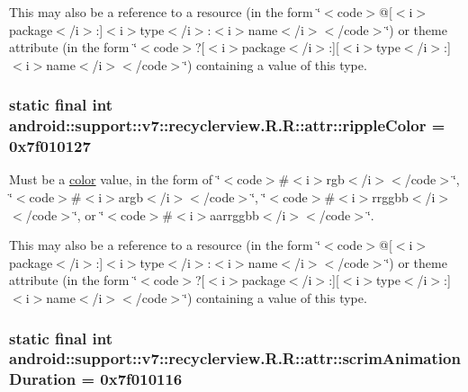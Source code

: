 This may also be a reference to a resource (in the form \char`\"{}$<$code$>$@\mbox{[}$<$i$>$package$<$/i$>$:\mbox{]}$<$i$>$type$<$/i$>$:$<$i$>$name$<$/i$>$$<$/code$>$\char`\"{}) or theme attribute (in the form \char`\"{}$<$code$>$?\mbox{[}$<$i$>$package$<$/i$>$:\mbox{]}\mbox{[}$<$i$>$type$<$/i$>$:\mbox{]}$<$i$>$name$<$/i$>$$<$/code$>$\char`\"{}) containing a value of this type. \hypertarget{classandroid_1_1support_1_1v7_1_1recyclerview_1_1_r_1_1attr_aa39993c99447facca3f15bc950aef26}{
\subsubsection[{rippleColor}]{\setlength{\rightskip}{0pt plus 5cm}static final int android::support::v7::recyclerview.R.R::attr::rippleColor = 0x7f010127}}
\label{classandroid_1_1support_1_1v7_1_1recyclerview_1_1_r_1_1attr_aa39993c99447facca3f15bc950aef26}


Must be a \hyperlink{classandroid_1_1support_1_1v7_1_1recyclerview_1_1_r_1_1color}{color} value, in the form of \char`\"{}$<$code$>$\#$<$i$>$rgb$<$/i$>$$<$/code$>$\char`\"{}, \char`\"{}$<$code$>$\#$<$i$>$argb$<$/i$>$$<$/code$>$\char`\"{}, \char`\"{}$<$code$>$\#$<$i$>$rrggbb$<$/i$>$$<$/code$>$\char`\"{}, or \char`\"{}$<$code$>$\#$<$i$>$aarrggbb$<$/i$>$$<$/code$>$\char`\"{}. 

This may also be a reference to a resource (in the form \char`\"{}$<$code$>$@\mbox{[}$<$i$>$package$<$/i$>$:\mbox{]}$<$i$>$type$<$/i$>$:$<$i$>$name$<$/i$>$$<$/code$>$\char`\"{}) or theme attribute (in the form \char`\"{}$<$code$>$?\mbox{[}$<$i$>$package$<$/i$>$:\mbox{]}\mbox{[}$<$i$>$type$<$/i$>$:\mbox{]}$<$i$>$name$<$/i$>$$<$/code$>$\char`\"{}) containing a value of this type. \hypertarget{classandroid_1_1support_1_1v7_1_1recyclerview_1_1_r_1_1attr_941cb0201ef764b680799034fb16cfc2}{
\subsubsection[{scrimAnimationDuration}]{\setlength{\rightskip}{0pt plus 5cm}static final int android::support::v7::recyclerview.R.R::attr::scrimAnimationDuration = 0x7f010116}}
\label{classandroid_1_1support_1_1v7_1_1recyclerview_1_1_r_1_1attr_941cb0201ef764b680799034fb16cfc2}


